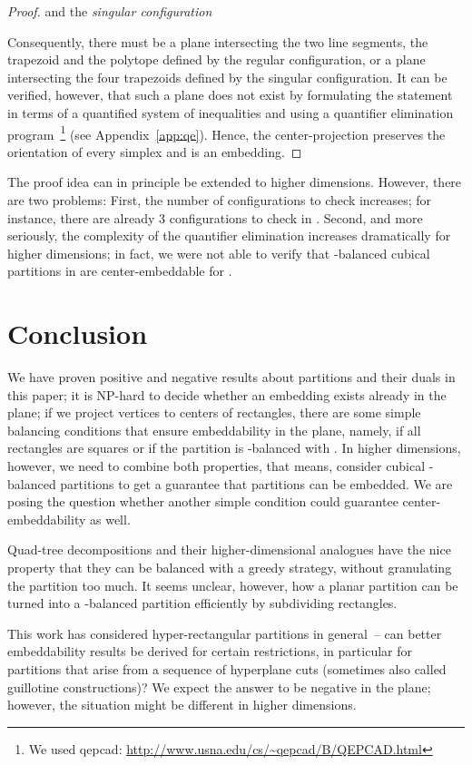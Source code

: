 \documentclass[12pt]{article}
\begin{document}
\begin{proof}
and the \emph{singular configuration}

Consequently, there must be a plane intersecting the two line segments, the
trapezoid and the polytope defined by the regular configuration,
or a plane intersecting the four trapezoids defined 
by the singular configuration. It can be verified, however, that such a plane
does not exist by formulating the statement in terms of a quantified
system of inequalities and using a quantifier elimination program~\cite{ch-partial}\footnote{We used
qepcad: \url{http://www.usna.edu/cs/~qepcad/B/QEPCAD.html}} (see Appendix~\ref{app:qe}). 
Hence, the center-projection
preserves the orientation of every simplex and is an embedding.
\end{proof}

The proof idea can in principle be extended to higher dimensions. However,
there are two problems: First, the number of configurations to check
increases; for instance, there are already 3 configurations to check in .
Second, and more seriously, the complexity of the quantifier elimination
increases dramatically for higher dimensions; in fact, we were not able
to verify that -balanced cubical partitions in  
are center-embeddable for .

\section{Conclusion}
\label{sec:conclusion}

We have proven positive and negative results about partitions and their duals 
in this paper; it is NP-hard to
decide whether an embedding exists already in the plane; if we project
vertices to centers of rectangles, there are some simple balancing
conditions that ensure embeddability in the plane, namely, if
all rectangles are squares or if the partition is -balanced
with . In higher dimensions, however, we need to combine
both properties, that means, consider cubical -balanced partitions
to get a guarantee that partitions can be embedded.
We are posing the question whether another simple condition could
guarantee center-embeddability as well.

Quad-tree decompositions and their higher-dimensional analogues have
the nice property that they can be balanced with a greedy strategy,
without granulating the partition too much. 
It seems unclear, however, how a planar partition can be
turned into a -balanced partition efficiently by subdividing
rectangles.

This work has considered
hyper-rectangular partitions in general~-- can better embeddability
results be derived for certain restrictions,
in particular for partitions that arise from a sequence of 
hyperplane cuts (sometimes also called guillotine constructions)?
We expect the answer to be negative in the plane; however, the
situation might be different in higher dimensions.
\end{document}
